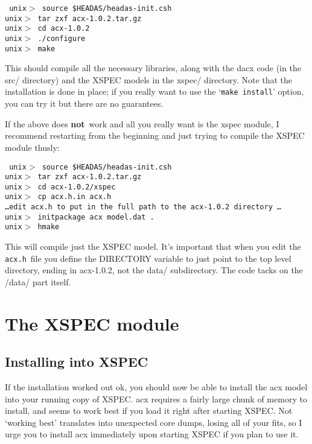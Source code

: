 \documentclass[11pt]{article}
\newcommand{\version}{1.0.2}
\begin{document}
{\tt
\noindent unix$>$ source \$HEADAS/headas-init.csh \\
\noindent unix$>$ tar zxf acx-\version.tar.gz \\
\noindent unix$>$ cd acx-\version \\
\noindent unix$>$ ./configure \\
\noindent unix$>$ make \\
}

This should compile all the necessary libraries, along with the dacx
code (in the src/ directory) and the XSPEC models in the xspec/
directory.  Note that the installation is done in place; if you really
want to use the `{\tt make install}' option, you can try it but there
are no guarantees.

If the above does {\bf not}\ work and all you really want is the xspec
module, I recommend restarting from the beginning and just trying to
compile the XSPEC module thusly:

{\tt
\noindent unix$>$ source \$HEADAS/headas-init.csh \\
\noindent unix$>$ tar zxf acx-\version.tar.gz\\
\noindent unix$>$ cd acx-\version/xspec\\
\noindent unix$>$ cp acx.h.in acx.h\\
\noindent \dots edit acx.h to put in the full path to the acx-\version
directory \dots\\
\noindent unix$>$ initpackage acx model.dat .\\
\noindent unix$>$ hmake\\
}

This will compile just the XSPEC model.  It's important that when you
edit the {\tt acx.h}\ file you define the DIRECTORY variable to just
point to the top level directory, ending in acx-\version, not the
data/ subdirectory.  The code tacks on the /data/ part itself.

\section*{The XSPEC module}

\subsection*{Installing into XSPEC}

If the installation worked out ok, you should now be able to install
the acx model into your running copy of XSPEC.  acx requires a fairly
large chunk of memory to install, and seems to work best if you load
it right after starting XSPEC.  Not `working best' translates into
unexpected core dumps, losing all of your fits, so I urge you to
install acx immediately upon starting XSPEC if you plan to use it.
\end{document}
